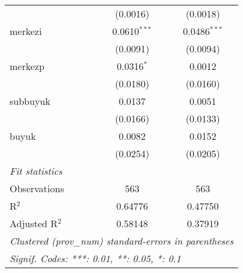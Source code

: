 \begin{table}[htbp]
\begin{tabular}{lcc}
                            & (0.0016)                & (0.0018)\\   
      merkezi               & 0.0610$^{***}$          & 0.0486$^{***}$\\   
                            & (0.0091)                & (0.0094)\\   
      merkezp               & 0.0316$^{*}$            & 0.0012\\   
                            & (0.0180)                & (0.0160)\\   
      subbuyuk              & 0.0137                  & 0.0051\\   
                            & (0.0166)                & (0.0133)\\   
      buyuk                 & 0.0082                  & 0.0152\\   
                            & (0.0254)                & (0.0205)\\   
      \midrule
      \emph{Fit statistics}\\
      Observations          & 563                     & 563\\  
      R$^2$                 & 0.64776                 & 0.47750\\  
      Adjusted R$^2$        & 0.58148                 & 0.37919\\  
      \midrule \midrule
      \multicolumn{3}{l}{\emph{Clustered (prov\_num) standard-errors in parentheses}}\\
      \multicolumn{3}{l}{\emph{Signif. Codes: ***: 0.01, **: 0.05, *: 0.1}}\\
   \end{tabular}
\end{table}



